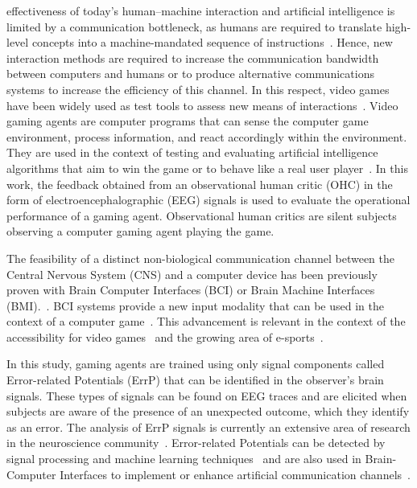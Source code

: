 \documentclass[journal]{IEEEtran}
\begin{document}
 effectiveness of today's human–machine interaction and artificial intelligence is limited by a communication bottleneck, as humans are required to translate high-level concepts into a machine-mandated sequence of instructions~\cite{Xu2020,CURSOR-CONTROL-PAPER}.   Hence, new interaction methods are required to increase the communication bandwidth between computers and humans or to produce alternative communications systems to increase the efficiency of this channel.  In this respect, video games have been widely used as test tools to assess new means of interactions~\cite{Carter2014,Barr2007}. Video gaming agents are computer programs that can sense the computer game environment, process information, and react accordingly within the environment.  They are used in the context of testing and evaluating artificial intelligence algorithms that aim to win the game or to behave like a real user player~\cite{Zhao2020}.
In this work, the feedback obtained from an observational human critic (OHC) in the form of electroencephalographic (EEG) signals is used to evaluate the operational performance of a gaming agent.  Observational human critics are silent subjects observing a computer gaming agent playing the game.

The feasibility of a distinct non-biological communication channel between the Central Nervous System (CNS) and a computer device has been previously proven with Brain Computer Interfaces (BCI) or Brain Machine Interfaces (BMI).~\cite{Vasiljevic2020}.  BCI systems provide a new input modality that can be used in the context of a computer game~\cite{Scherer2012,Nijholt2007}. This advancement is relevant in the context of the accessibility for video games~\cite{Aguado-Delgado2020} and the growing area of e-sports~\cite{Yakovlev2020}.

In this study, gaming agents are trained using only signal components called Error-related Potentials (ErrP) that can be identified in the observer's brain signals.  These types of signals can be found on EEG traces and are elicited when subjects are aware of the presence of an unexpected outcome, which they identify as an error.  The analysis of ErrP signals is currently an extensive area of research in the neuroscience community~\cite{Holroyd2009}. Error-related Potentials can be detected by signal processing and machine learning techniques~\cite{EERP-PAPER} and are also used in Brain-Computer Interfaces to implement or enhance artificial communication channels~\cite{Chavarriaga2014}.
\end{document}
